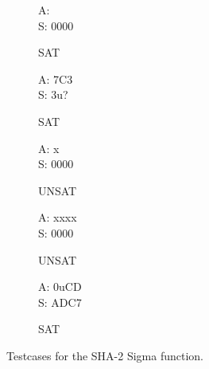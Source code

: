 \begin{figure}[p]
  \begin{center}
    \begin{subfigure}[b]{0.23\textwidth}
      \begin{diffchar}
        A: \textendash{}\textendash{}\textendash{}\textendash{} \\
        S: 0000
      \end{diffchar}
      \caption{SAT}
      \label{dc:tcs-sigma-1}
    \end{subfigure}
    \begin{subfigure}[b]{0.23\textwidth}
      \begin{diffchar}
        A: 7C\textendash{}3 \\
        S: \textendash{}3u?
      \end{diffchar}
      \caption{SAT}
      \label{dc:tcs-sigma-2}
    \end{subfigure}
  \end{center}

  \begin{center}
    \begin{subfigure}[b]{0.23\textwidth}
      \begin{diffchar}
        A: \textendash{}\textendash{}\textendash{}x \\
        S: 0000
      \end{diffchar}
      \caption{UNSAT}
      \label{dc:tcs-sigma-3}
    \end{subfigure}
    \begin{subfigure}[b]{0.23\textwidth}
      \begin{diffchar}
        A: xxxx \\
        S: 0000 \\
      \end{diffchar}
      \caption{UNSAT}
      \label{dc:tcs-sigma-4}
    \end{subfigure}
    \begin{subfigure}[b]{0.23\textwidth}
      \begin{diffchar}
        A: 0uCD \\
        S: ADC7 \\
      \end{diffchar}
      \caption{SAT}
      \label{dc:tcs-sigma-5}
    \end{subfigure}
  \end{center}
  \caption{Testcases for the SHA-2 Sigma function.}
  \label{dc:tcs-sha2}
\end{figure}

